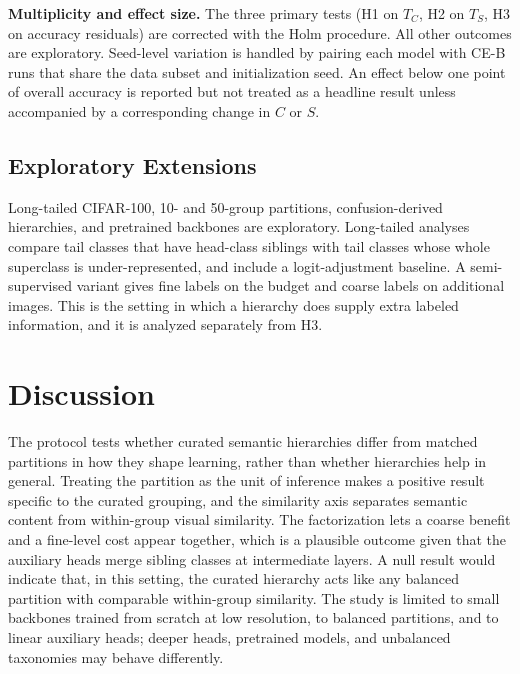 \documentclass[conference]{IEEEtran}
\begin{document}
\textbf{Multiplicity and effect size.} The three primary tests (H1 on $T_C$, H2 on $T_S$, H3 on accuracy residuals) are corrected with the Holm procedure. All other outcomes are exploratory. Seed-level variation is handled by pairing each model with CE-B runs that share the data subset and initialization seed. An effect below one point of overall accuracy is reported but not treated as a headline result unless accompanied by a corresponding change in $C$ or $S$.

\subsection{Exploratory Extensions}
Long-tailed CIFAR-100, 10- and 50-group partitions, confusion-derived hierarchies, and pretrained backbones are exploratory. Long-tailed analyses compare tail classes that have head-class siblings with tail classes whose whole superclass is under-represented, and include a logit-adjustment baseline. A semi-supervised variant gives fine labels on the budget and coarse labels on additional images. This is the setting in which a hierarchy does supply extra labeled information, and it is analyzed separately from H3.

\section{Discussion}
The protocol tests whether curated semantic hierarchies differ from matched partitions in how they shape learning, rather than whether hierarchies help in general. Treating the partition as the unit of inference makes a positive result specific to the curated grouping, and the similarity axis separates semantic content from within-group visual similarity. The factorization lets a coarse benefit and a fine-level cost appear together, which is a plausible outcome given that the auxiliary heads merge sibling classes at intermediate layers. A null result would indicate that, in this setting, the curated hierarchy acts like any balanced partition with comparable within-group similarity. The study is limited to small backbones trained from scratch at low resolution, to balanced partitions, and to linear auxiliary heads; deeper heads, pretrained models, and unbalanced taxonomies may behave differently.
\end{document}
